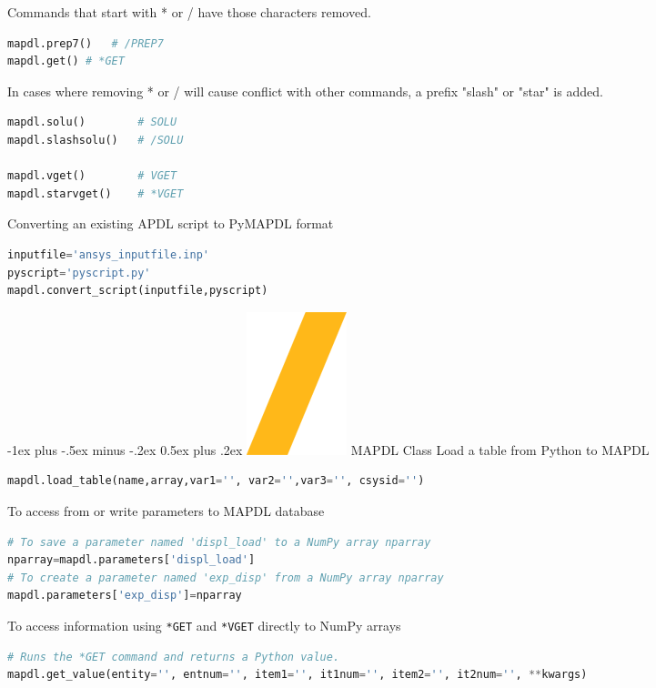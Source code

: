 \documentclass[9pt,landscape]{article}
\makeatletter
\renewcommand{\section}{\@startsection{section}{1}{0mm}%
                                {-1ex plus -.5ex minus -.2ex}%
                                {0.5ex plus .2ex}%
                                {\normalfont\large\bfseries}}
\def\code#1{\texttt{#1}}
\makeatother
\begin{document}
\begin{multicols}{3}
Commands that start with * or / have those characters removed.
\begin{lstlisting}[language=Python]
mapdl.prep7()	# /PREP7
mapdl.get()	# *GET
\end{lstlisting}

In cases where removing * or / will cause conflict with other commands, a prefix "slash" or "star" is added.
\begin{lstlisting}[language=Python]
mapdl.solu()		# SOLU
mapdl.slashsolu()	# /SOLU

mapdl.vget()		# VGET
mapdl.starvget()	# *VGET
\end{lstlisting} 

Converting an existing APDL script to PyMAPDL format
\begin{lstlisting}[language=Python]
inputfile='ansys_inputfile.inp'
pyscript='pyscript.py'
mapdl.convert_script(inputfile,pyscript)
\end{lstlisting}
\columnbreak

\section{\includegraphics[height=\fontcharht\font`\S]{slash.png} MAPDL Class}
Load a table from Python to MAPDL
\begin{lstlisting}[language=Python]
mapdl.load_table(name,array,var1='', var2='',var3='', csysid='')
\end{lstlisting}
To access from or write parameters to MAPDL database
\begin{lstlisting}[language=Python]
# To save a parameter named 'displ_load' to a NumPy array nparray
nparray=mapdl.parameters['displ_load']
# To create a parameter named 'exp_disp' from a NumPy array nparray
mapdl.parameters['exp_disp']=nparray
\end{lstlisting}

To access information using \code{*GET} and \code{*VGET} directly to NumPy arrays
\begin{lstlisting}[language=Python]
# Runs the *GET command and returns a Python value.
mapdl.get_value(entity='', entnum='', item1='', it1num='', item2='', it2num='', **kwargs)


\end{lstlisting}
\end{multicols}
\end{document}
